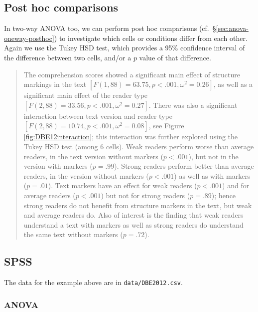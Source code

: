 \documentclass[
]{book}
\begin{document}
\hypertarget{sec:anova-twoway-posthoc}{%
\subsection{Post hoc comparisons}\label{sec:anova-twoway-posthoc}}

In two-way ANOVA too, we can perform post hoc comparisons (cf.~§\ref{sec:anova-oneway-posthoc}) to investigate which cells or conditions differ from each other. Again we use the Tukey HSD test, which provides a 95\% confidence interval of the difference between two cells, and/or a \(p\) value of that difference.

\begin{quote}
The comprehension scores showed a significant main effect of structure markings in the text \([F(1,88)=63.75, p<.001, \omega^2=0.26]\), as well as a significant main effect of the reader type \([F(2,88)=33.56, p<.001, \omega^2=0.27]\).
There was also a significant interaction between text version and reader type \([F(2,88)=10.74, p<.001, \omega^2=0.08]\), see Figure \ref{fig:DBE12interaction}; this interaction was further explored using the Tukey HSD test (among 6 cells).
Weak readers perform worse than average readers, in the text version without markers (\(p<.001\)), but not in the version with markers (\(p=.99\)).
Strong readers perform better than average readers, in the version without markers (\(p<.001\)) as well as with markers (\(p=.01\)).
Text markers have an effect for weak readers (\(p<.001\)) and for average readers (\(p<.001\)) but not for strong readers (\(p=.89\)); hence strong readers do not benefit from structure markers in the text, but weak and average readers do.
Also of interest is the finding that weak readers understand a text with markers as well as strong readers do understand the same text without markers (\(p=.72\)).
\end{quote}

\hypertarget{spss-13}{%
\subsection{SPSS}\label{spss-13}}

The data for the example above are in \texttt{data/DBE2012.csv}.

\hypertarget{anova-3}{%
\subsubsection{ANOVA}\label{anova-3}}
\end{document}
